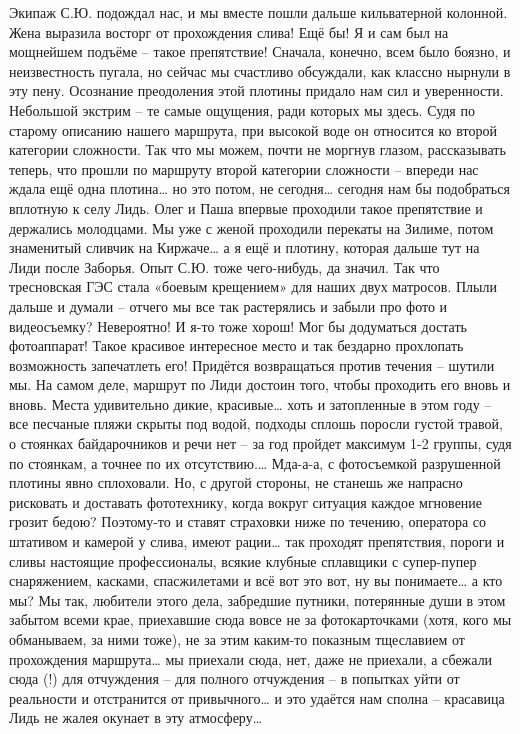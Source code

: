 Экипаж С.Ю. подождал нас, и мы вместе пошли дальше кильватерной колонной. Жена выразила восторг от прохождения слива! Ещё бы! Я и сам был на мощнейшем подъёме – такое препятствие! Сначала, конечно, всем было боязно, и неизвестность пугала, но сейчас мы счастливо обсуждали, как классно нырнули в эту пену. Осознание преодоления этой плотины придало нам сил и уверенности. Небольшой экстрим – те самые ощущения, ради которых мы здесь. 
Судя по старому описанию нашего маршрута, при высокой воде он относится ко второй категории сложности. Так что мы можем, почти не моргнув глазом, рассказывать теперь, что прошли по маршруту второй категории сложности – впереди нас ждала ещё одна плотина… но это потом, не сегодня… сегодня нам бы подобраться вплотную к селу Лидь. Олег и Паша впервые проходили такое препятствие и держались молодцами. Мы уже с женой проходили перекаты на Зилиме, потом знаменитый сливчик на Киржаче… а я ещё и плотину, которая дальше тут на Лиди после Заборья. Опыт С.Ю. тоже чего-нибудь, да значил. Так что тресновская ГЭС стала «боевым крещением» для наших двух матросов.
Плыли дальше и думали – отчего мы все так растерялись и забыли про фото и видеосъемку? Невероятно! И я-то тоже хорош! Мог бы додуматься достать фотоаппарат! Такое красивое интересное место и так бездарно прохлопать возможность запечатлеть его! Придётся возвращаться против течения – шутили мы. На самом деле, маршрут по Лиди достоин того, чтобы проходить его вновь и вновь. Места удивительно дикие, красивые… хоть и затопленные в этом году – все песчаные пляжи скрыты под водой, подходы сплошь поросли густой травой, о стоянках байдарочников и речи нет – за год пройдет максимум 1-2 группы, судя по стоянкам, а точнее по их отсутствию.… 
Мда-а-а, с фотосъемкой разрушенной плотины явно сплоховали. Но, с другой стороны, не станешь же напрасно рисковать и доставать фототехнику, когда вокруг ситуация каждое мгновение грозит бедою? Поэтому-то и ставят страховки ниже по течению, оператора со штативом и камерой у слива, имеют рации… так проходят препятствия, пороги и сливы настоящие профессионалы, всякие клубные сплавщики с супер-пупер снаряжением, касками, спасжилетами и всё вот это вот, ну вы понимаете… а кто мы? Мы так, любители этого дела, забредшие путники, потерянные души в этом забытом всеми крае, приехавшие сюда вовсе не за фотокарточками (хотя, кого мы обманываем, за ними тоже), не за этим каким-то показным тщеславием от прохождения маршрута… мы приехали сюда, нет, даже не приехали, а сбежали сюда (!) для отчуждения – для полного отчуждения – в попытках уйти от реальности и отстранится от привычного… и это удаётся нам сполна – красавица Лидь не жалея окунает в эту атмосферу…
